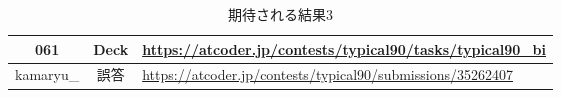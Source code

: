 \begin{table}[h]
    \centering
    \caption{期待される結果3}
    \label{tab:61}
    \begin{adjustbox}{center}
    \begin{tabular}{|c|c|p{10cm}|}%
        \hline
        061 & Deck & \url{https://atcoder.jp/contests/typical90/tasks/typical90_bi} \\ \hline
        kamaryu\_ &誤答 
        & \url{https://atcoder.jp/contests/typical90/submissions/35262407} \\ \hline
    \end{tabular}
    \end{adjustbox}
\end{table}





